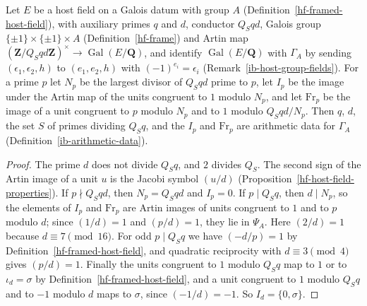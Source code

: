 \begin{lemma}\label{ib-host-arithmetic-data}
Let $E$ be a host field on a Galois datum with group $A$
(Definition~\ref{hf-framed-host-field}), with auxiliary primes $q$ and $d$,
conductor $Q_Sqd$, Galois group
$\{\pm1\}\times\{\pm1\}\times A$ (Definition~\ref{hf-frame}) and Artin map
$(\mathbf Z/Q_Sqd\mathbf Z)^\times\to\operatorname{Gal}(E/\mathbf Q)$, and
identify $\operatorname{Gal}(E/\mathbf Q)$ with $\Gamma_A$ by sending
$(\epsilon_1,\epsilon_2,h)$ to $(e_1,e_2,h)$ with $(-1)^{e_i}=\epsilon_i$
(Remark~\ref{ib-host-group-fields}). For a prime $p$ let $N_p$ be the largest
divisor of $Q_Sqd$ prime to $p$, let $I_p$ be the image under the Artin map of the units congruent to $1$
modulo $N_p$, and let $\mathrm{Fr}_p$ be the image of a unit congruent to $p$
modulo $N_p$ and to $1$ modulo $Q_Sqd/N_p$. Then $q$, $d$, the set $S$ of primes
dividing $Q_Sq$, and the $I_p$ and $\mathrm{Fr}_p$ are arithmetic data for
$\Gamma_A$ (Definition~\ref{ib-arithmetic-data}).
\end{lemma}
\begin{proof}
The prime $d$ does not divide $Q_Sq$, and $2$ divides $Q_S$. The second sign
of the Artin image of a unit $u$ is the Jacobi symbol $(u/d)$
(Proposition~\ref{hf-host-field-properties}). If $p\nmid Q_Sqd$, then $N_p=Q_Sqd$ and
$I_p=0$. If $p\mid Q_Sq$, then $d\mid N_p$, so the elements of $I_p$ and
$\mathrm{Fr}_p$ are Artin images of units congruent to $1$ and to $p$ modulo $d$;
since $(1/d)=1$ and $(p/d)=1$, they lie in $\Psi_A$. Here $(2/d)=1$ because
$d\equiv7\pmod{16}$. For odd $p\mid Q_Sq$ we have $(-d/p)=1$ by
Definition~\ref{hf-framed-host-field}, and quadratic reciprocity with
$d\equiv3\pmod4$ gives $(p/d)=1$. Finally the units congruent to $1$ modulo
$Q_Sq$ map to $1$ or to $\iota_d=\sigma$ by Definition~\ref{hf-framed-host-field},
and a
unit congruent to $1$ modulo $Q_Sq$ and to $-1$ modulo $d$ maps to $\sigma$,
since $(-1/d)=-1$. So $I_d=\{0,\sigma\}$.
\end{proof}

